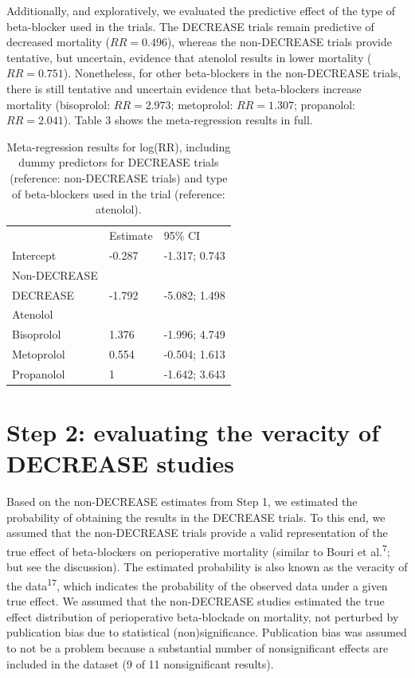 \documentclass[]{article}
\begin{document}
Additionally, and exploratively, we evaluated the predictive effect of
the type of beta-blocker used in the trials. The DECREASE trials remain
predictive of decreased mortality (\(RR=0.496\)), whereas the
non-DECREASE trials provide tentative, but uncertain, evidence that
atenolol results in lower mortality (\(RR=0.751\)). Nonetheless, for
other beta-blockers in the non-DECREASE trials, there is still tentative
and uncertain evidence that beta-blockers increase mortality
(bisoprolol: \(RR=2.973\); metoprolol: \(RR=1.307\); propanolol:
\(RR=2.041\)). Table 3 shows the meta-regression results in full.

\begin{longtable}[]{@{}lll@{}}
\caption{Meta-regression results for log(RR), including dummy predictors
for DECREASE trials (reference: non-DECREASE trials) and type of
beta-blockers used in the trial (reference: atenolol).}\tabularnewline
\toprule
& Estimate & 95\% CI\tabularnewline
Intercept & -0.287 & -1.317; 0.743\tabularnewline
Non-DECREASE & &\tabularnewline
DECREASE & -1.792 & -5.082; 1.498\tabularnewline
Atenolol & &\tabularnewline
Bisoprolol & 1.376 & -1.996; 4.749\tabularnewline
Metoprolol & 0.554 & -0.504; 1.613\tabularnewline
Propanolol & 1 & -1.642; 3.643\tabularnewline
\bottomrule
\end{longtable}

\section{Step 2: evaluating the veracity of DECREASE
studies}\label{step-2-evaluating-the-veracity-of-decrease-studies}

Based on the non-DECREASE estimates from Step 1, we estimated the
probability of obtaining the results in the DECREASE trials. To this
end, we assumed that the non-DECREASE trials provide a valid
representation of the true effect of beta-blockers on perioperative
mortality (similar to Bouri et al.\textsuperscript{7}; but see the
discussion). The estimated probability is also known as the veracity of
the data\textsuperscript{17}, which indicates the probability of the
observed data under a given true effect. We assumed that the
non-DECREASE studies estimated the true effect distribution of
perioperative beta-blockade on mortality, not perturbed by publication
bias due to statistical (non)significance. Publication bias was assumed
to not be a problem because a substantial number of nonsignificant
effects are included in the dataset (9 of 11 nonsignificant results).
\end{document}
